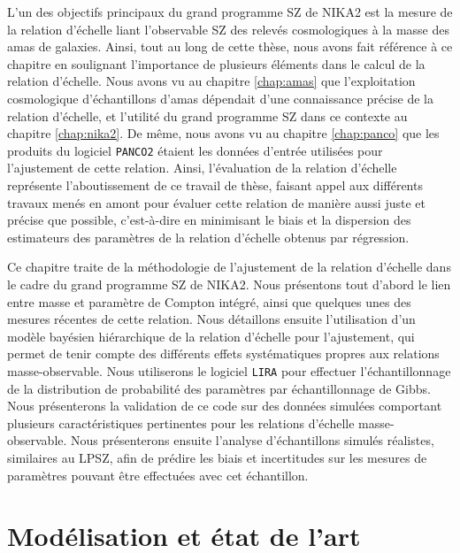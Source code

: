 L'un des objectifs principaux du grand programme SZ de NIKA2 est la mesure de la relation d'échelle liant l'observable SZ des relevés cosmologiques à la masse des amas de galaxies.
Ainsi, tout au long de cette thèse, nous avons fait référence à ce chapitre en soulignant l'importance de plusieurs éléments dans le calcul de la relation d'échelle.
Nous avons vu au chapitre \ref{chap:amas} que l'exploitation cosmologique d'échantillons d'amas dépendait d'une connaissance précise de la relation d'échelle, et l'utilité du grand programme SZ dans ce contexte au chapitre \ref{chap:nika2}.
De même, nous avons vu au chapitre \ref{chap:panco} que les produits du logiciel \texttt{PANCO2} étaient les données d'entrée utilisées pour l'ajustement de cette relation.
Ainsi, l'évaluation de la relation d'échelle représente l'aboutissement de ce travail de thèse, faisant appel aux différents travaux menés en amont pour évaluer cette relation de manière aussi juste et précise que possible, c'est-à-dire en minimisant le biais et la dispersion des estimateurs des paramètres de la relation d'échelle obtenus par régression.

Ce chapitre traite de la méthodologie de l'ajustement de la relation d'échelle dans le cadre du grand programme SZ de NIKA2.
Nous présentons tout d'abord le lien entre masse et paramètre de Compton intégré, ainsi que quelques unes des mesures récentes de cette relation.
Nous détaillons ensuite l'utilisation d'un modèle bayésien hiérarchique de la relation d'échelle pour l'ajustement, qui permet de tenir compte des différents effets systématiques propres aux relations masse-observable.
Nous utiliserons le logiciel \texttt{LIRA} \cite{sereno_bayesian_2016} pour effectuer l'échantillonnage de la distribution de probabilité des paramètres par échantillonnage de Gibbs.
Nous présenterons la validation de ce code sur des données simulées comportant plusieurs caractéristiques pertinentes pour les relations d'échelle masse-observable.
Nous présenterons ensuite l'analyse d'échantillons simulés réalistes, similaires au LPSZ, afin de prédire les biais et incertitudes sur les mesures de paramètres pouvant être effectuées avec cet échantillon.

\section{Modélisation et état de l'art}

